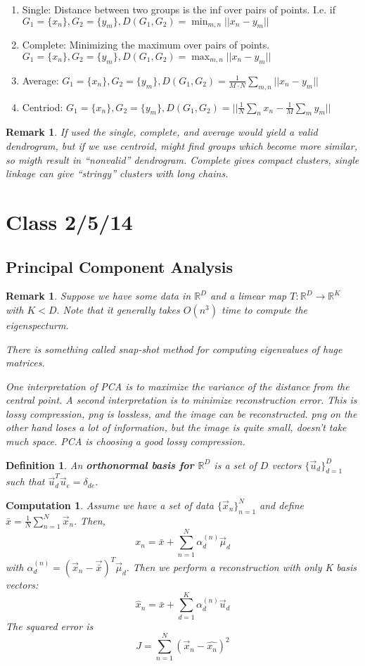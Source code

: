 \documentclass{amsart}
\newtheorem{comp}[subsubsection]{Computation}
\newtheorem{defn}[subsubsection]{Definition}
\newtheorem{rem}[subsubsection]{Remark}
\begin{document}
\begin{enumerate}
\item Single: Distance between two groups is the inf over pairs of points. I.e. if $G_1 = \{x_n\},G_2=\{y_m\}, 
D(G_1,G_2)=\min_{m,n}||x_n - y_m||$

\item Complete: Minimizing the maximum over pairs of points. $G_1 = \{x_n\},G_2=\{y_m\}, D(G_1,G_2)=\max_{m,n}||x_n - y_m||$

\item Average:  $G_1 = \{x_n\},G_2=\{y_m\}, D(G_1,G_2)=\frac 1 {M \cdot N} \sum_{m,n}||x_n - y_m||$ 
\item Centriod: $G_1 = \{x_n\},G_2=\{y_m\}, D(G_1,G_2)=||\frac 1 {N} \sum_n x_n -\frac 1 {M}\sum_m y_m||$ 
\end{enumerate}

\begin{rem}

If used the single, complete, and average would yield a valid dendrogram, but if we use centroid, might find groups which become more similar, so migth result in ``nonvalid'' dendrogram. Complete gives compact clusters, single linkage can give ``stringy'' clusters with long chains.
\end{rem}
\section{Class 2/5/14}

\subsection {Principal Component Analysis}
\begin{rem}
Suppose we have some data in $\mathbb R ^D$ and a limear map $T:\mathbb R^D \rightarrow \mathbb R^K$ with $K<D.$
Note that it generally takes $O(n^3)$ time to compute the eigenspecturm.

There is something called snap-shot method for computing eigenvalues of huge matrices.

One interpretation of PCA is to maximize the variance of the distance from the central point. A second interpretation is to minimize reconstruction error. This is lossy compression, png is lossless, and the image can be reconstructed. png on the other hand loses a lot of information, but the image is quite small, doesn't take much space. PCA is choosing a good lossy compression.
\end{rem}
\begin{defn}
An {\bf orthonormal basis for $\mathbb R^D$} is a set of $D$ vectors $\{\vec u_d\}_{d=1}^D$ such that $\vec u_d^T \vec u_e = \delta_{de}.$
\end{defn}
\begin{comp}
Assume we have a set of data $\{\vec x_n \}_{n=1}^N$ and define $\bar x = \frac 1 N \sum_{n=1}^N \vec x_n.$ Then, 
$$x_n = \bar x + \sum_{n=1}^N \alpha_d^{(n)}\vec \mu_d$$
with $\alpha_d^{(n)} = (\vec x_n - \vec {\bar x})^T \vec \mu_d.$
Then we perform a reconstruction with only K basis vectors:
$$\hat x_n =\bar x + \sum_{d=1}^K \alpha_d ^{(n)} \vec u_d$$
The squared error is
$$J = \sum_{n=1}^N (\vec x_n - \hat {x_n})^2 $$
\end{comp}
\end{document}
